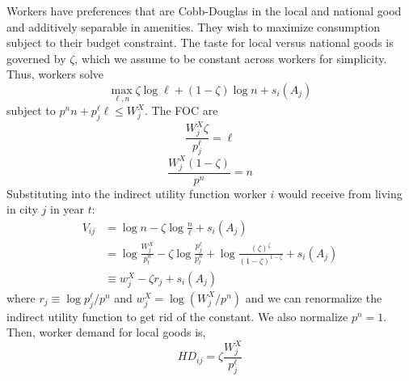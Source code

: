 \documentclass{article}
\begin{document}
Workers have preferences that are Cobb-Douglas in  the local and national good and additively separable in amenities. They wish to maximize consumption subject to their budget constraint. The taste for local versus national goods is governed by $\zeta$, which we assume to be constant across workers for simplicity. Thus, workers solve 
\begin{equation}\label{eq_worker_util_max}
    \max_{\ell,n} \zeta \log \ell + (1-\zeta)\log n + s_i(A_{j})
\end{equation}
subject to $p^n n + p^\ell_{j}\ell\leq W^X_{j}$. The FOC are
$$\frac{W^X_{j}\zeta}{p^\ell_{j}} = \ell$$
$$\frac{W^X_{j}(1-\zeta)}{p^n} = n$$
Substituting into the indirect utility function worker $i$ would receive from living in city $j$ in year $t$:
\begin{align}
    V_{ij} &= \log n - \zeta \log \frac{n}{\ell} + s_i(A_{j}) \nonumber \\ 
    &= \log \frac{W^X_{j}}{p^n_{t}} - \zeta \log\frac{p^\ell_{j}}{p^n_{t}} + \log\frac{(\zeta)^\zeta}{(1-\zeta)^{1-\zeta}} + s_i(A_{j})  \nonumber \\
    &\equiv w^X_{j} - \zeta r_{j} + s_i(A_{j})
\end{align}
where $r_{j} \equiv \log p_{j}^\ell/p^n$ and $w_{j}^X = \log (W_{j}^X/p^n)$ and we can renormalize the indirect utility function to get rid of the constant. We also normalize $p^n=1$.
Then, worker demand for local goods is,
\begin{equation}\label{eq_worker_local_demand}
    HD_{ij} = \zeta \frac{W^X_{j}}{p^\ell_{j}}
\end{equation}

 
\end{document}
